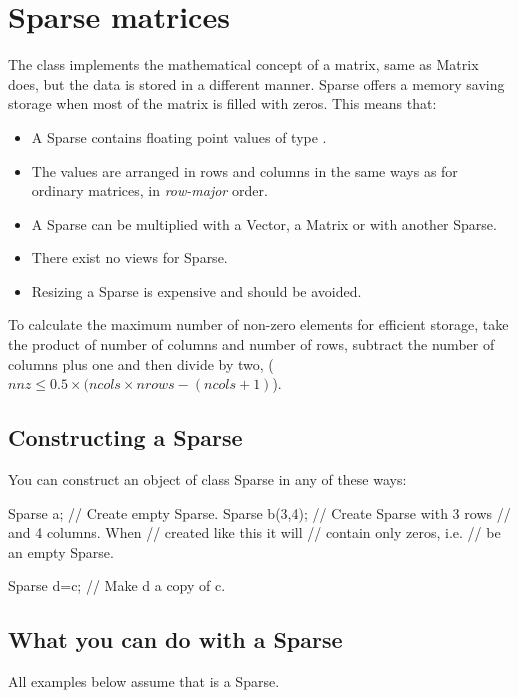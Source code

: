 \section{Sparse matrices}
\label{sec:matpack:sparse}

The class  implements the mathematical concept of a
matrix, same as Matrix does, but the data is stored in a
different manner. Sparse offers a memory saving storage when
most of the matrix is filled with zeros. This means that:
\begin{itemize}
\item A Sparse contains floating point values of type .
\item The values are arranged in rows and columns in the same ways as for
  ordinary matrices, in \emph{row-major} order.
\item A Sparse can be multiplied with a Vector, a Matrix or with another
  Sparse.
\item There exist no views for Sparse.
\item Resizing a Sparse is expensive and should be avoided.
\end{itemize}

To calculate the maximum number of non-zero elements for efficient storage,
take the product of number of columns and number of rows, subtract the
number of columns plus one and then divide by two,
\mbox{($nnz \leq 0.5\times (ncols\times nrows - (ncols+1)$).}

\subsection{Constructing a Sparse}
You can construct an object of class Sparse in any of these ways:

\begin{code}
Sparse a;          // Create empty Sparse.
Sparse b(3,4);     // Create Sparse with 3 rows
                   // and 4 columns. When
                   // created like this it will
                   // contain only zeros, i.e.
                   // be an empty Sparse.

Sparse d=c;        // Make d a copy of c.
\end{code}

\subsection{What you can do with a Sparse}
All examples below assume that  is a Sparse.

